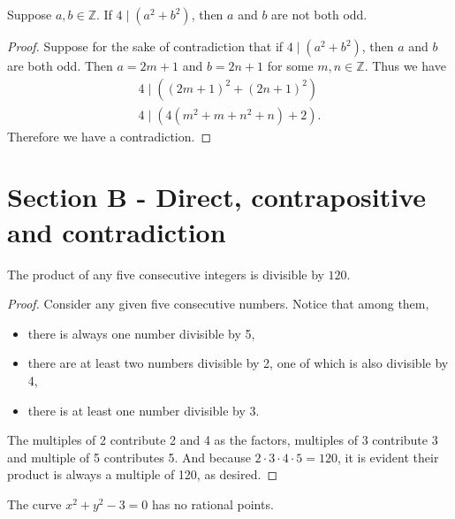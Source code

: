 \documentclass{exam}
\begin{document}
\begin{proposition}{6.18}
    Suppose $a,b\in\mathbb Z$. If $4\mid(a^2+b^2)$, then $a$ and $b$ are not both odd.
\end{proposition}

\begin{proof}
    Suppose for the sake of contradiction that if $4\mid(a^2+b^2)$, then $a$ and $b$ are both odd. Then $a = 2m+1$ and $b = 2n+1$ for some $m,n\in\mathbb Z$. Thus we have 
    \begin{align*}
        4\mid((2m+1)^2+(2n+1)^2)\\
        4\mid(4(m^2+m+n^2+n)+2).
    \end{align*}
    Therefore we have a contradiction.
\end{proof}

\section{Section B - Direct, contrapositive and contradiction}

\begin{proposition}{6.19}
    The product of any five consecutive integers is divisible by $120$.
\end{proposition}

\begin{proof}
    Consider any given five consecutive numbers. Notice that among them, \begin{itemize}
        \item there is always one number divisible by 5,
        \item there are at least two numbers divisible by 2, one of which is also divisible by 4,
        \item there is at least one number divisible by 3.
    \end{itemize}
    The multiples of 2 contribute 2 and 4 as the factors, multiples of 3 contribute 3 and multiple of 5 contributes 5. And because $2\cdot3\cdot4\cdot5=120$, it is evident their product is always a multiple of 120, as desired.
\end{proof}

\begin{proposition}{6.20}
    The curve $x^2+y^2-3=0$ has no rational points.
\end{proposition}
\end{document}
